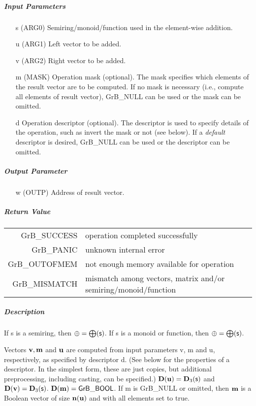 \subparagraph{Input Parameters}

\begin{itemize}
	\item[{\sf s}] ({\sf ARG0}) Semiring/monoid/function used in the element-wise addition.

	\item[{\sf u}] ({\sf ARG1}) Left vector to be added.

	\item[{\sf v}] ({\sf ARG2}) Right vector to be added.

	\item[{\sf m}] ({\sf MASK}) Operation mask (optional). The mask
	specifies which elements of the result vector are to be computed.
	If no mask is necessary (i.e., compute all elements of result
	vector), {\sf GrB\_NULL} can be used or the mask can be omitted.

	\item[{\sf d}] Operation descriptor (optional). The descriptor
	is used to specify details of the operation, such as 
	invert the mask or not (see below). If a
	\emph{default} descriptor is desired, {\sf GrB\_NULL} can be
	used or the descriptor can be omitted.
\end{itemize}

\subparagraph{Output Parameter}

\begin{itemize}
	\item[{\sf w}] ({\sf OUTP}) Address of result vector.
\end{itemize}

\subparagraph{Return Value}

\begin{tabular}{rl} 
{\sf GrB\_SUCCESS} 	& operation completed successfully \\
{\sf GrB\_PANIC}	& unknown internal error \\
{\sf GrB\_OUTOFMEM}	& not enough memory available for operation \\
{\sf GrB\_MISMATCH}	& mismatch among vectors, matrix and/or semiring/monoid/function
\end{tabular}

\subparagraph{Description}

If {\sf s} is a semiring, then $\oplus = \bigoplus({\sf s})$. 
If {\sf s} is a monoid or function, then $\oplus = \bigoplus({\sf s})$.

Vectors ${\bf v}, {\bf m}$ and ${\bf u}$ are computed from
input parameters {\sf v}, {\sf m} and {\sf u}, respectively, as specified
by descriptor {\sf d}. (See below for the properties of a descriptor. In
the simplest form, these are just copies, but additional preprocessing,
including casting, can be specified.)  $\bold{D}({\bf u}) =
\bold{D}_3({\sf s})$ and $\bold{D}({\bf v}) = \bold{D}_3({\sf s})$.
$\bold{D}({\bf m}) = {\sf GrB\_BOOL}$.  If {\sf m} is {\sf GrB\_NULL} or omitted,
then ${\bf m}$ is a Boolean vector of size $\bold{n}({\bf u})$
and with all elements set to {\sf true}.

